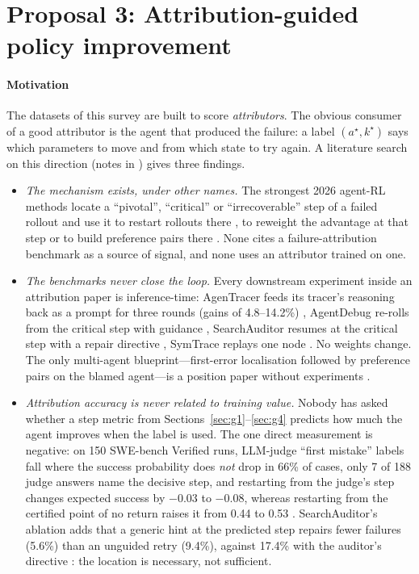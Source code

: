 \section{Proposal 3: Attribution-guided policy improvement}\label{sec:future:train}

\paragraph{Motivation} The datasets of this survey are built to score \emph{attributors}. The obvious consumer of a good attributor is the agent that produced the failure: a label $(a^\star,k^\star)$ says which parameters to move and from which state to try again. A literature search on this direction (notes in ) gives three findings.
\begin{itemize}[leftmargin=1.1em]
\item \emph{The mechanism exists, under other names.} The strongest 2026 agent-RL methods locate a ``pivotal'', ``critical'' or ``irrecoverable'' step of a failed rollout and use it to restart rollouts there \cite{tian2026mirl,guo2026pivoarl,shi2026r3l,liu2026sprout,liang2026elpo}, to reweight the advantage at that step \cite{zhu2026fault,huang2026etro,jung2026prover,agentevolver2025,zhu2026lvrl} or to build preference pairs there \cite{li2026cso,yuan2025agentr,steca2025,cuarecovery2026}. None cites a failure-attribution benchmark as a source of signal, and none uses an attributor trained on one.
\item \emph{The benchmarks never close the loop.} Every downstream experiment inside an attribution paper is inference-time: AgenTracer feeds its tracer's reasoning back as a prompt for three rounds (gains of 4.8--14.2\%) \cite{agentracer2026}, AgentDebug re-rolls from the critical step with guidance \cite{agentdebug2026}, SearchAuditor resumes at the critical step with a repair directive \cite{searchauditor2026}, SymTrace replays one node \cite{luan2026symtrace}. No weights change. The only multi-agent blueprint---first-error localisation followed by preference pairs on the blamed agent---is a position paper without experiments \cite{yang2025blame}.
\item \emph{Attribution accuracy is never related to training value.} Nobody has asked whether a step metric from Sections~\ref{sec:g1}--\ref{sec:g4} predicts how much the agent improves when the label is used. The one direct measurement is negative: on 150 SWE-bench Verified runs, LLM-judge ``first mistake'' labels fall where the success probability does \emph{not} drop in 66\% of cases, only 7 of 188 judge answers name the decisive step, and restarting from the judge's step changes expected success by $-0.03$ to $-0.08$, whereas restarting from the certified point of no return raises it from 0.44 to 0.53 \cite{shen2026epv}. SearchAuditor's ablation adds that a generic hint at the predicted step repairs fewer failures (5.6\%) than an unguided retry (9.4\%), against 17.4\% with the auditor's directive \cite{searchauditor2026}: the location is necessary, not sufficient.
\end{itemize}
